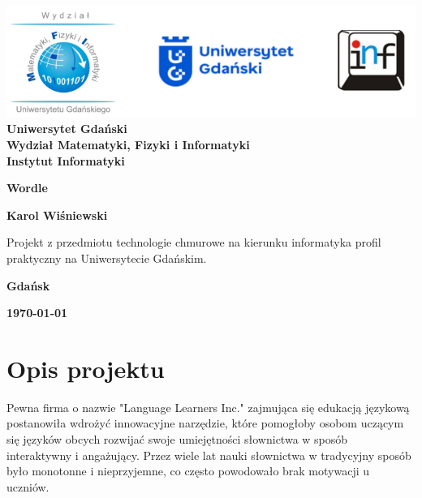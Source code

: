 \documentclass[12pt,a4paper]{article}
\newcommand{\hmwkTitle}{Wordle} %
\newcommand{\hmwkDueDate}{\today} %
\newcommand{\hmwkAuthorName}{Karol Wiśniewski} %
\begin{document}
\begin{titlepage}
    \vfill
	\begin{center}
	\hspace*{-1cm}
	\vspace*{0.5cm}
    \includegraphics[scale=0.55]{imagens/loga.png}\\
	\textbf{Uniwersytet Gdański \\ [0.05cm]Wydział Matematyki, Fizyki i Informatyki \\ [0.05cm] Instytut Informatyki}

	\vspace{0.6cm}
	\vspace{4cm}
	{\huge \textbf{\hmwkTitle}}\vspace{8mm}
	
	{\large \textbf{\hmwkAuthorName}}\\[3cm]
	
		\hspace{.45\textwidth} %
	   \begin{minipage}{.5\textwidth}
	   Projekt z przedmiotu technologie chmurowe na kierunku informatyka profil praktyczny na Uniwersytecie Gdańskim.\\[0.1cm]
	  \end{minipage}
	  \vfill
	
	\textbf{Gdańsk}
	
	\textbf{\hmwkDueDate}
	\end{center}
	
\end{titlepage}

\newpage
\setcounter{secnumdepth}{5}
\tableofcontents
\newpage

\section{Opis projektu}
\label{sec:Project}

Pewna firma o nazwie "Language Learners Inc." zajmująca się edukacją językową postanowiła wdrożyć innowacyjne narzędzie, które pomogłoby osobom uczącym się języków obcych rozwijać swoje umiejętności słownictwa w sposób interaktywny i angażujący. Przez wiele lat nauki słownictwa w tradycyjny sposób było monotonne i nieprzyjemne, co często powodowało brak motywacji u uczniów.
\end{document}
